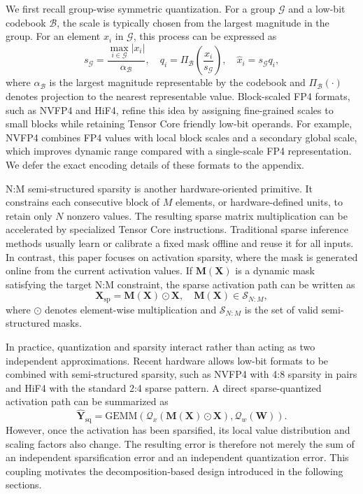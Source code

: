 \documentclass{article}
\begin{document}
We first recall group-wise symmetric quantization. For a group
$\mathcal{G}$ and a low-bit codebook $\mathcal{B}$, the scale is typically
chosen from the largest magnitude in the group. For an element $x_i$ in
$\mathcal{G}$, this process can be expressed as
\begin{equation}
  s_{\mathcal{G}} =
  \frac{\max_{i \in \mathcal{G}} |x_i|}{\alpha_{\mathcal{B}}},
  \quad
  q_i =
  \Pi_{\mathcal{B}}\left(\frac{x_i}{s_{\mathcal{G}}}\right),
  \quad
  \widehat{x}_i = s_{\mathcal{G}} q_i ,
  \label{eq:group-quant}
\end{equation}
where $\alpha_{\mathcal{B}}$ is the largest magnitude representable by the
codebook and $\Pi_{\mathcal{B}}(\cdot)$ denotes projection to the nearest
representable value. Block-scaled FP4 formats, such as NVFP4 and HiF4, refine
this idea by assigning fine-grained scales to small blocks while retaining
Tensor Core friendly low-bit operands. For example, NVFP4 combines FP4 values
with local block scales and a secondary global scale, which improves dynamic
range compared with a single-scale FP4 representation. We defer the exact
encoding details of these formats to the appendix.

N:M semi-structured sparsity is another hardware-oriented primitive. It
constrains each consecutive block of $M$ elements, or hardware-defined units, to
retain only $N$ nonzero values. The resulting sparse matrix multiplication can be
accelerated by specialized Tensor Core instructions. Traditional sparse
inference methods usually learn or calibrate a fixed mask offline and reuse it
for all inputs. In contrast, this paper focuses on activation sparsity, where the
mask is generated online from the current activation values. If
$\mathbf{M}(\mathbf{X})$ is a dynamic mask satisfying the target N:M constraint,
the sparse activation path can be written as
\begin{equation}
  \mathbf{X}_{\mathrm{sp}} =
  \mathbf{M}(\mathbf{X}) \odot \mathbf{X},
  \quad
  \mathbf{M}(\mathbf{X}) \in \mathcal{S}_{N:M},
  \label{eq:dynamic-mask}
\end{equation}
where $\odot$ denotes element-wise multiplication and $\mathcal{S}_{N:M}$ is the
set of valid semi-structured masks.

In practice, quantization and sparsity interact rather than acting as two
independent approximations. Recent hardware allows low-bit formats to be combined
with semi-structured sparsity, such as NVFP4 with 4:8 sparsity in pairs and HiF4
with the standard 2:4 sparse pattern. A direct sparse-quantized activation path
can be summarized as
\begin{equation}
  \widehat{\mathbf{Y}}_{\mathrm{sq}} =
  \mathrm{GEMM}\left(
    \mathcal{Q}_x(\mathbf{M}(\mathbf{X}) \odot \mathbf{X}),
    \mathcal{Q}_w(\mathbf{W})
  \right).
  \label{eq:direct-sparse-quant}
\end{equation}
However, once the activation has been sparsified, its local value distribution
and scaling factors also change. The resulting error is therefore not merely the
sum of an independent sparsification error and an independent quantization error.
This coupling motivates the decomposition-based design introduced in the
following sections.
\end{document}
